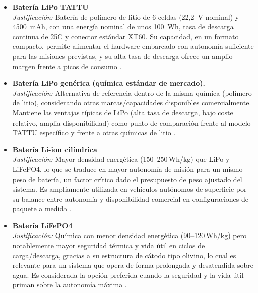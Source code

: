 \begin{itemize}

  \item \textbf{Batería LiPo TATTU} \\
  \textit{Justificación:} Batería de polímero de litio de 6 celdas (22,2~V nominal) y 4500~mAh, 
  con una energía nominal de unos 100~Wh, tasa de descarga continua de 25C y conector estándar XT60. 
  Su capacidad, en un formato compacto, permite alimentar el hardware embarcado con autonomía suficiente para las 
  misiones previstas, y su alta tasa de descarga ofrece un amplio margen frente a picos de consumo \cite{Cite22}. \\

  \item \textbf{Batería LiPo genérica (química estándar de mercado).} \\
  \textit{Justificación:} Alternativa de referencia dentro de la misma química (polímero de litio), 
  considerando otras marcas/capacidades disponibles comercialmente. Mantiene las ventajas típicas de 
  LiPo (alta tasa de descarga, bajo coste relativo, amplia disponibilidad) como punto de comparación 
  frente al modelo TATTU específico y frente a otras químicas de litio \cite{Cite23}. \\

  \item \textbf{Batería Li-ion cilíndrica} \\
  \textit{Justificación:} Mayor densidad energética (150--250\,Wh/kg) que LiPo y LiFePO4, lo que se 
  traduce en mayor autonomía de misión para un mismo peso de batería, un factor crítico dado el 
  presupuesto de peso ajustado del sistema. Es ampliamente utilizada en vehículos autónomos de superficie 
  por su balance entre autonomía y disponibilidad comercial en configuraciones de paquete a medida \cite{Cite23}. \\

  \item \textbf{Batería LiFePO4} \\
  \textit{Justificación:} Química con menor densidad energética (90--120\,Wh/kg) pero notablemente mayor 
  seguridad térmica y vida útil en ciclos de carga/descarga, gracias a su estructura de cátodo tipo 
  olivino, lo cual es relevante para un sistema que opera de forma prolongada y desatendida sobre agua. 
  Es considerada la opción preferida cuando la seguridad y la vida útil priman sobre la autonomía máxima \cite{Cite23}. \\

\end{itemize}

